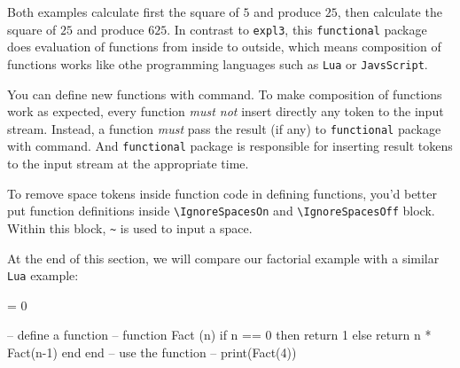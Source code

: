 \documentclass[oneside]{book}
\begin{document}


Both examples calculate first the square of $5$ and produce $25$,
then calculate the square of $25$ and produce $625$.
In contrast to \verb!expl3!, this \verb!functional! package
does evaluation of functions from inside to outside,
which means composition of functions works like othe programming languages
such as \verb!Lua! or \verb!JavsScript!.

You can define new functions with  command.
To make composition of functions work as expected,
every function \emph{must not} insert directly any token to the input stream.
Instead, a function \emph{must} pass the result (if any) to \verb!functional! package
with  command. And \verb!functional! package is responsible for
inserting result tokens to the input stream at the appropriate time.

To remove space tokens inside function code in defining functions,
you'd better put function definitions inside \verb!\IgnoreSpacesOn! and
\verb!\IgnoreSpacesOff! block. Within this block, \verb!~! is used to input a space.

At the end of this section,
we will compare our factorial example with a similar \verb!Lua! example:

\begin{minipage}{0.69\textwidth}
\begin{codehigh}
\IgnoreSpacesOn
\PrgNewFunction {} {
   = {0} {
  }{
  }
}
\IgnoreSpacesOff
{}
\end{codehigh}
\end{minipage}%
\begin{minipage}{0.31\textwidth}
\begin{code}
-- define a function --
function Fact (n)
  if n == 0 then
    return 1
  else
    return n * Fact(n-1)
  end
end
-- use the function --
print(Fact(4))
\end{code}
\end{minipage}

\end{document}
